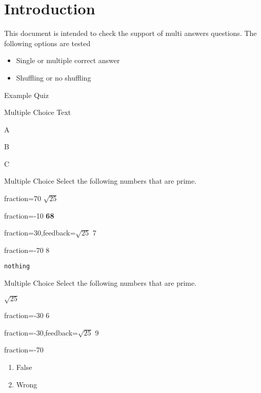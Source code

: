 \documentclass{article}
\begin{document}
\section*{Introduction}

This document is intended to check the support of multi answers questions. The 
following options are tested
\begin{itemize}
	\item Single or multiple correct answer
	\item Shuffling or no shuffling
\end{itemize}

\begin{quiz}{Example Quiz}

\begin{multi}{Multiple Choice}
Text
\item* A
\item B
\item C
\end{multi}

\begin{multi}[multiple,feedback={abc\\def $\sqrt{2}$}]{Multiple Choice}
Select the following numbers that are prime.
\item[fraction=70] $\sqrt{25}$
\item[fraction=-10] \textbf{68}
\item[fraction=30,feedback={$\sqrt{25}$}] 7
\item[fraction=-70] 8
\item \texttt{nothing}
\end{multi}

\begin{multi}[shuffle,feedback={abc\\def $\sqrt{2}$}]{Multiple Choice}
Select the following numbers that are prime.
\item* $\sqrt{25}$
\item[fraction=-30] 6
\item[fraction=-30,feedback={$\sqrt{25}$}] 9
\item[fraction=-70] \begin{enumerate}
\item False
\item Wrong
\end{enumerate}
\end{multi}

\end{quiz}
\end{document}
